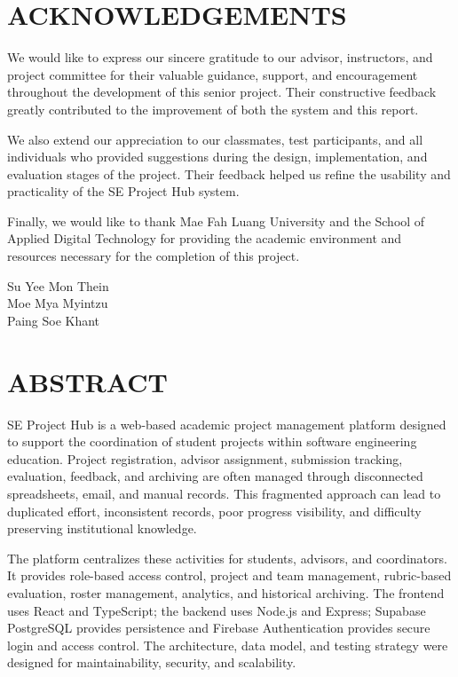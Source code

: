 \documentclass[12pt,a4paper]{report}
\begin{document}
\clearpage\chapter*{ACKNOWLEDGEMENTS}
We would like to express our sincere gratitude to our advisor, instructors, and project committee for their valuable guidance, support, and encouragement throughout the development of this senior project. Their constructive feedback greatly contributed to the improvement of both the system and this report.

We also extend our appreciation to our classmates, test participants, and all individuals who provided suggestions during the design, implementation, and evaluation stages of the project. Their feedback helped us refine the usability and practicality of the SE Project Hub system.

Finally, we would like to thank Mae Fah Luang University and the School of Applied Digital Technology for providing the academic environment and resources necessary for the completion of this project.
\vfill\begin{flushright}Su Yee Mon Thein\\Moe Mya Myintzu\\Paing Soe Khant\end{flushright}

\clearpage\chapter*{ABSTRACT}
SE Project Hub is a web-based academic project management platform designed to support the coordination of student projects within software engineering education. Project registration, advisor assignment, submission tracking, evaluation, feedback, and archiving are often managed through disconnected spreadsheets, email, and manual records. This fragmented approach can lead to duplicated effort, inconsistent records, poor progress visibility, and difficulty preserving institutional knowledge.

The platform centralizes these activities for students, advisors, and coordinators. It provides role-based access control, project and team management, rubric-based evaluation, roster management, analytics, and historical archiving. The frontend uses React and TypeScript; the backend uses Node.js and Express; Supabase PostgreSQL provides persistence and Firebase Authentication provides secure login and access control. The architecture, data model, and testing strategy were designed for maintainability, security, and scalability.
\end{document}
